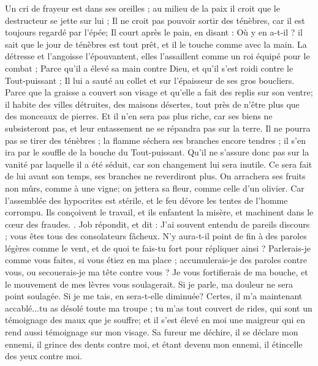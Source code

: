 \begin{multicols}{2}
{Un cri de frayeur est dans ses oreilles ; au milieu de la paix il croit que le destructeur se jette sur lui ;
Il ne croit pas pouvoir sortir des ténèbres, car il est toujours regardé par l'épée;
Il court après le pain, en disant : Où y en a-t-il ? il sait que le jour de ténèbres est tout prêt, et il le touche comme avec la main.
La détresse et l'angoisse l'épouvantent, elles l'assaillent comme un roi équipé pour le combat ;
Parce qu'il a élevé sa main contre Dieu, et qu'il s'est roidi contre le Tout-puissant ;
Il lui a sauté au collet et sur l'épaisseur de ses gros boucliers. 
Parce que la graisse a couvert son visage et qu'elle a fait des replis sur son ventre;
 il habite des villes détruites, des maisons désertes, tout près de n'être plus que des monceaux de pierres. 
Et il n'en sera pas plus riche, car ses biens ne subsisteront pas, et leur entassement ne se répandra pas sur la terre.
Il ne pourra pas se tirer des ténèbres ; la flamme séchera ses branches encore tendres ; il s'en ira par le souffle de la bouche du Tout-puissant.
Qu'il ne s'assure donc pas sur la vanité par laquelle il a été séduit, car son changement lui sera inutile.
Ce sera fait de lui avant son temps, ses branches ne reverdiront plus. 
On arrachera ses fruits non mûrs, comme à une vigne; on jettera sa fleur, comme celle d'un olivier. 
Car l'assemblée des hypocrites est stérile, et le feu dévore les tentes de l'homme corrompu.
Ils conçoivent le travail, et ils enfantent la misère, et machinent dans le cœur des fraudes. .
\VerseOne{}Job répondit, et dit :
J'ai souvent entendu de pareils discours ; vous êtes tous des consolateurs fâcheux.
N'y aura-t-il point de fin à des paroles légères comme le vent, et de quoi te fais-tu fort pour répliquer ainsi ?
Parlerais-je comme vous faites, si vous étiez en ma place ; accumulerais-je des paroles contre vous, ou secouerais-je ma tête contre vous ? 
Je vous fortifierais de ma bouche, et le mouvement de mes lèvres vous soulagerait.
Si je parle, ma douleur ne sera point soulagée. Si je me tais, en sera-t-elle diminuée?
Certes, il m'a maintenant accablé...tu as désolé toute ma troupe ; 
tu m'as tout couvert de rides, qui sont un témoignage des maux que je souffre; et il s'est élevé en moi une maigreur qui en rend aussi témoignage sur mon visage. 
Sa fureur me déchire, il se déclare mon ennemi, il grince des dents contre moi, et étant devenu mon ennemi, il étincelle des yeux contre moi.
}
\end{multicols}
